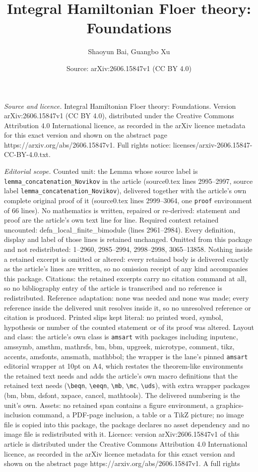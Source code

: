\documentclass[10pt,a4paper]{amsart}
\title[Integral Hamiltonian Floer theory: Foundations]{Integral Hamiltonian Floer theory: Foundations}
\author{Shaoyun Bai, Guangbo Xu}
\date{Source: arXiv:2606.15847v1 (CC BY 4.0)}
\begin{document}
\maketitle

\noindent\emph{Source and licence.} Integral Hamiltonian Floer theory: Foundations. Version arXiv:2606.15847v1 (CC BY 4.0), distributed under the Creative Commons Attribution 4.0 International licence, as recorded in the arXiv licence metadata for this exact version and shown on the abstract page https://arxiv.org/abs/2606.15847v1. Full rights notice: licenses/arxiv-2606.15847-CC-BY-4.0.txt.\par\smallskip

\noindent\textit{Editorial scope.} Counted unit: the Lemma whose source label is \texttt{lemma\_concatenation\_Novikov} in the article (source0.tex lines 2995--2997, source label \texttt{lemma\_concatenation\_Novikov}), delivered together with the article's own complete original proof of it (source0.tex lines 2999--3064, one \texttt{proof} environment of 66 lines). No mathematics is written, repaired or re-derived: statement and proof are the article's own text line for line. Required context retained uncounted: defn\_local\_finite\_bimodule (lines 2961--2984). Every definition, display and label of those lines is retained unchanged. Omitted from this package and not redistributed: 1--2960, 2985--2994, 2998--2998, 3065--13858. Nothing inside a retained excerpt is omitted or altered: every retained body is delivered exactly as the article's lines are written, so no omission receipt of any kind accompanies this package. Citations: the retained excerpts carry no citation command at all, so no bibliography entry of the article is transcribed and no reference is redistributed. Reference adaptation: none was needed and none was made; every reference inside the delivered unit resolves inside it, so no unresolved reference or citation is produced. Printed slips kept literal: no printed word, symbol, hypothesis or number of the counted statement or of its proof was altered. Layout and class: the article's own class is \texttt{amsart} with packages including inputenc, amssymb, amsthm, mathrsfs, bm, bbm, upgreek, microtype, comment, tikz, accents, amsfonts, amsmath, mathbbol; the wrapper is the lane's pinned \texttt{amsart} editorial wrapper at 10pt on A4, which restates the theorem-like environments the retained text needs and adds the article's own macro definitions that the retained text needs (\texttt{\textbackslash beqn}, \texttt{\textbackslash eeqn}, \texttt{\textbackslash mb}, \texttt{\textbackslash mc}, \texttt{\textbackslash uds}), with extra wrapper packages (bm, bbm, dsfont, xspace, cancel, mathtools). The delivered numbering is the unit's own. Assets: no retained span contains a figure environment, a graphics-inclusion command, a PDF-page inclusion, a table or a TikZ picture; no image file is copied into this package, the package declares no asset dependency and no image file is redistributed with it. Licence: version arXiv:2606.15847v1 of this article is distributed under the Creative Commons Attribution 4.0 International licence, as recorded in the arXiv licence metadata for this exact version and shown on the abstract page https://arxiv.org/abs/2606.15847v1. A full rights 
\end{document}
